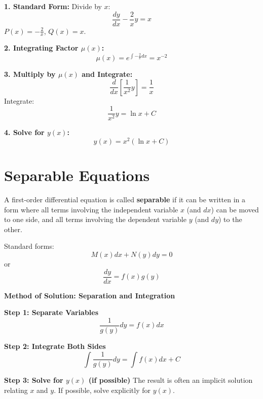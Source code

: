 \documentclass[12pt, letterpaper]{book}
\begin{document}
\textbf{1. Standard Form:}
Divide by $x$:
\begin{equation*}
    \frac{dy}{dx} - \frac{2}{x}y = x
\end{equation*}
$P(x) = -\frac{2}{x}$, $Q(x) = x$.

\textbf{2. Integrating Factor $\mu(x)$:}
\begin{equation*}
    \mu(x) = e^{\int -\frac{2}{x}dx} = x^{-2}
\end{equation*}

\textbf{3. Multiply by $\mu(x)$ and Integrate:}
\begin{equation*}
    \frac{d}{dx}\left[\frac{1}{x^2}y\right] = \frac{1}{x}
\end{equation*}
Integrate:
\begin{equation*}
    \frac{1}{x^2}y = \ln x + C
\end{equation*}

\textbf{4. Solve for $y(x)$:}
\begin{equation*}
    y(x) = x^2(\ln x + C)
\end{equation*}

\section{Separable Equations}
A first-order differential equation is called \textbf{separable} if it can be written in a form where all terms involving the independent variable $x$ (and $dx$) can be moved to one side, and all terms involving the dependent variable $y$ (and $dy$) to the other.

Standard forms:
\begin{equation*}
    M(x)dx + N(y)dy = 0
\end{equation*}
or
\begin{equation*}
    \frac{dy}{dx} = f(x)g(y)
\end{equation*}

\textbf{Method of Solution: Separation and Integration}

\textbf{Step 1: Separate Variables}
\begin{equation*}
    \frac{1}{g(y)}dy = f(x)dx
\end{equation*}

\textbf{Step 2: Integrate Both Sides}
\begin{equation*}
    \int \frac{1}{g(y)}dy = \int f(x)dx + C
\end{equation*}

\textbf{Step 3: Solve for $y(x)$ (if possible)}
The result is often an implicit solution relating $x$ and $y$. If possible, solve explicitly for $y(x)$.
\end{document}

